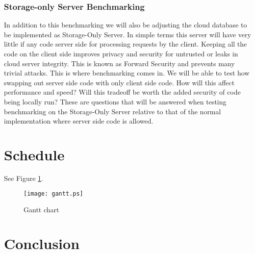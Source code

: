 \documentclass[onecolumn, draftclsnofoot,10pt, compsoc]{IEEEtran}
\begin{document}
\subsubsection {Storage-only Server Benchmarking}
In addition to this benchmarking we will also be adjusting the cloud database to be implemented as Storage-Only Server. In simple terms this server will have very little if any code server side for processing requests by the client. Keeping all the code on the client side improves privacy and security for untrusted or leaks in cloud server integrity. This is known as Forward Security and prevents many trivial attacks. This is where benchmarking comes in. We will be able to test how swapping out server side code with only client side code. How will this affect performance and speed? Will this tradeoff be worth the added security of code being locally run? These are questions that will be answered when testing benchmarking on the Storage-Only Server relative to that of the normal implementation where server side code is allowed.


\section{ Schedule }

See Figure \ref{figure:gantt}.

\begin{figure}
\centering
\texttt{[image: gantt.ps]}
\caption{Gantt chart}
\label{figure:gantt}
\end{figure}








\section{ Conclusion }





\end{document}
